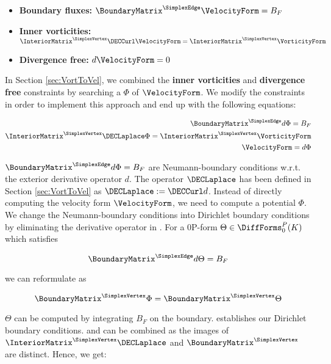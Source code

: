 \begin{itemize}
\item \textbf{Boundary fluxes: } $\BoundaryMatrix^\SimplexEdge \VelocityForm = B_F$
\item \textbf{Inner vorticities: } $\InteriorMatrix^\SimplexVertex \DECCurl \VelocityForm = \InteriorMatrix^\SimplexVertex \VorticityForm$
\item \textbf{Divergence free: } $d \VelocityForm = 0$
\end{itemize}


In Section \ref{sec:VortToVel}, we combined the \textbf{inner vorticities} and \textbf{divergence free} constraints by searching a  $\Phi$
of $\VelocityForm$. We modify the constraints in order to implement this approach and end up with the following equations:

\begin{eqnarray}
\label{eq:BoundaryFluxes} 
\BoundaryMatrix^\SimplexEdge d \Phi = B_F \\
\label{eq:InnerVorticityPotential}
\InteriorMatrix^\SimplexVertex \DECLaplace \Phi =\InteriorMatrix^\SimplexVertex \VorticityForm \\
\VelocityForm = d \Phi
\end{eqnarray}

$\BoundaryMatrix^\SimplexEdge d \Phi = B_F$ are Neumann-boundary conditions w.r.t. the exterior derivative operator $d$.
The operator $\DECLaplace$ has been defined in Section \ref{sec:VortToVel} as $\DECLaplace := \DECCurl d$.
Instead of directly computing the velocity form $\VelocityForm$, we need to compute a potential $\Phi$.
We change the Neumann-boundary conditions into Dirichlet boundary conditions by eliminating the derivative operator in .
For a 0P-form $\Theta \in \DiffForms_0^P(K)$ which satisfies

\begin{equation}
\BoundaryMatrix^\SimplexEdge d \Theta = B_F
\end{equation}

we can reformulate  as

\begin{equation}
\label{eq:BForcePotential}
\BoundaryMatrix^\SimplexVertex \Phi = \BoundaryMatrix^\SimplexVertex \Theta
\end{equation}

$\Theta$ can be computed by integrating $B_F$ on the boundary.
 establishes our Dirichlet boundary conditions.
 and  can be combined as
the images of $\InteriorMatrix^\SimplexVertex \DECLaplace$ and $\BoundaryMatrix^\SimplexVertex$ are distinct. 
Hence, we get:

